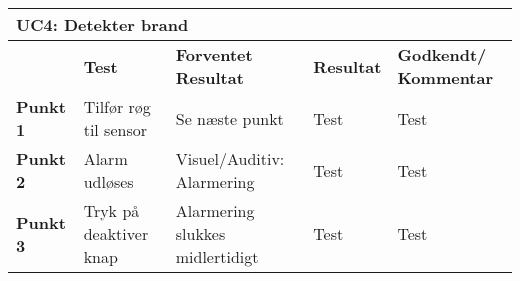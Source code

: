\begin{table}[htbp] \centering
\begin{tabular}{|p{}|p{}|p{3cm}|p{3cm}|p{3cm}|} %
	\hline
\multicolumn{5}{|l|}{\textbf{UC4: Detekter brand}} \\\hline
&\textbf{Test} &\textbf{Forventet \newline Resultat} &\textbf{Resultat} &\textbf{Godkendt/ \newline Kommentar} \\\hline
\textbf{Punkt 1} &
Tilfør røg til sensor &
Se næste punkt &
Test & 
Test \\\hline
\textbf{Punkt 2} &
Alarm udløses &
Visuel/Auditiv: Alarmering &
Test	 &
Test \\\hline
\textbf{Punkt 3} &
Tryk på deaktiver knap &
Alarmering slukkes midlertidigt&
Test	 &
Test \\\hline
	\end{tabular}
	\label{ATUC4} 
\end{table}